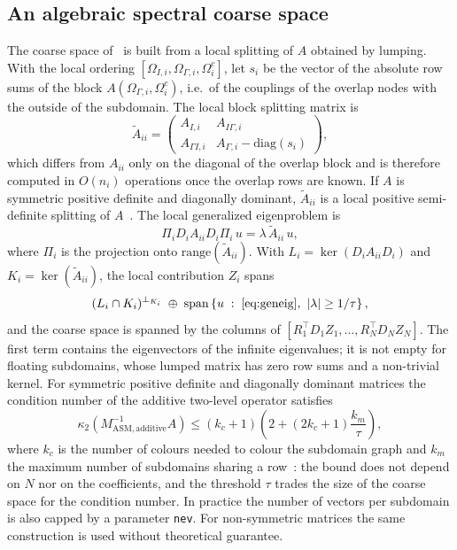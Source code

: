 \documentclass[11pt,a4paper]{article}
\newcommand{\At}{\widetilde{A}}
\begin{document}
\subsection{An algebraic spectral coarse space}\label{sec:coarse}

The coarse space of~\cite{AlDaas2023} is built from a local splitting of $A$ obtained by lumping. With the
local ordering $[\Omega_{I,i},\Omega_{\Gamma,i},\Omega^c_i]$, let $s_i$ be the vector of the absolute row
sums of the block $A(\Omega_{\Gamma,i},\Omega^c_i)$, i.e.\ of the couplings of the overlap nodes with the
outside of the subdomain. The local block splitting matrix is
\begin{equation}\label{eq:splitting}
  \At_{ii} = \begin{pmatrix} A_{I,i} & A_{I\Gamma,i}\\ A_{\Gamma I,i} & A_{\Gamma,i}-\mathrm{diag}(s_i)\end{pmatrix},
\end{equation}
which differs from $A_{ii}$ only on the diagonal of the overlap block and is therefore computed in $O(n_i)$
operations once the overlap rows are known. If $A$ is symmetric positive definite and diagonally dominant,
$\At_{ii}$ is a local positive semi-definite splitting of $A$~\cite[Lemma~3.2]{AlDaas2023}. The local
generalized eigenproblem is
\begin{equation}\label{eq:geneig}
  \Pi_i D_i A_{ii} D_i \Pi_i\,u = \lambda\,\At_{ii}\,u ,
\end{equation}
where $\Pi_i$ is the projection onto $\mathrm{range}(\At_{ii})$. With $L_i=\ker(D_iA_{ii}D_i)$ and
$K_i=\ker(\At_{ii})$, the local contribution $Z_i$ spans
\begin{equation}\label{eq:Zi}
  (L_i\cap K_i)^{\perp_{K_i}} \;\oplus\; \mathrm{span}\left\{u \;:\; \eqref{eq:geneig},\ |\lambda|\geq 1/\tau\right\},
\end{equation}
and the coarse space is spanned by the columns of $[R_1^\top D_1 Z_1,\dots,R_N^\top D_N Z_N]$. The first term
contains the eigenvectors of the infinite eigenvalues; it is not empty for floating subdomains, whose lumped
matrix has zero row sums and a non-trivial kernel. For symmetric positive definite and diagonally dominant
matrices the condition number of the additive two-level operator satisfies
\begin{equation}\label{eq:bound}
  \kappa_2\!\left(M^{-1}_{\mathrm{ASM,additive}}A\right) \leq (k_c+1)\left(2 + (2k_c+1)\frac{k_m}{\tau}\right),
\end{equation}
where $k_c$ is the number of colours needed to colour the subdomain graph and $k_m$ the maximum number of
subdomains sharing a row~\cite{AlDaas2023}: the bound does not depend on $N$ nor on the coefficients, and the
threshold $\tau$ trades the size of the coarse space for the condition number. In practice the number of
vectors per subdomain is also capped by a parameter \texttt{nev}. For non-symmetric matrices the same
construction is used without theoretical guarantee.
\end{document}

